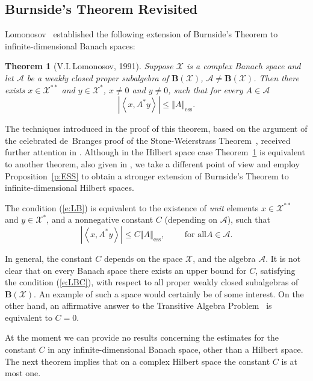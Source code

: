 \documentclass{tran-l}
\newtheorem{thm}{Theorem}[subsection]
\theoremstyle{definition}
\theoremstyle{remark}
\numberwithin{equation}{subsection}
\DeclareMathOperator{\ess}{ess}
\newcommand{\A}{\mathcal{A}}
\newcommand{\X}{\mathcal{X}}
\newcommand{\BOP}{\mathbf{B}}
\newcommand{\abs}[1]{\left\vert#1\right\vert}
\newcommand{\seq}[1]{\left<#1\right>}
\newcommand{\norm}[1]{\left\Vert#1\right\Vert}
\newcommand{\essnorm}[1]{\norm{#1}_{\ess}}
\begin{document}

\subsection{Burnside's Theorem Revisited}
Lomonosov~\cite{Lom91} established the following extension of Burnside's Theorem to infinite-dimensional Banach spaces:

\begin{thm}[V.I.\,Lomonosov, 1991]\label{t:LOMBUR}
Suppose $\X$ is a complex Banach space and let $\A$ be a weakly closed proper subalgebra of $\BOP(\X)$, $\A\neq\BOP(\X)$. Then there exists $x\in{\X^{**}}$ and $y\in{\X^*}$, $x\neq0$ and $y\neq0$, such that for every $A\in\A$
\begin{equation}\label{e:LB}
  \abs{\seq{x,A^*y}}\leq\essnorm{A}.
\end{equation}
\end{thm}

The techniques introduced in the proof of this theorem, based on the argument of the celebrated de~Branges proof of the Stone-Weierstrass Theorem~\cite{dB59}, received further attention in \cite{AAB95,dB93}. Although in the Hilbert space case Theorem~\ref{t:LOMBUR} is equivalent to another theorem, also given in \cite{Lom91}, we take a different point of view and employ Proposition~\ref{p:ESS} to obtain a stronger extension of Burnside's Theorem to infinite-dimensional Hilbert spaces.

The condition (\ref{e:LB}) is equivalent to the existence of \emph{unit} elements $x\in{\X^{**}}$ and $y\in{\X^*}$, and a nonnegative constant $C$ (depending on $\A$), such that
\begin{equation}\label{e:LBC}
  \abs{\seq{x,A^*y}}\leq C \essnorm{A}, \qquad \text{ for all
$A\in\A$}.
\end{equation}

In general, the constant $C$ depends on the space $\X$, and the algebra $\A$. It is not clear that on every Banach space there exists an upper bound for $C$, satisfying the condition (\ref{e:LBC}), with respect to all proper weakly closed subalgebras of $\BOP(\X)$. An example of such a space would certainly be of some interest. On the other hand, an affirmative answer to the Transitive Algebra Problem~\cite{RR73} is equivalent to $C=0$.

At the moment we can provide no results concerning the estimates for the constant $C$ in any infinite-dimensional Banach space, other than a Hilbert space. The next theorem implies that on a complex Hilbert space the constant $C$ is at most one.
\end{document}

